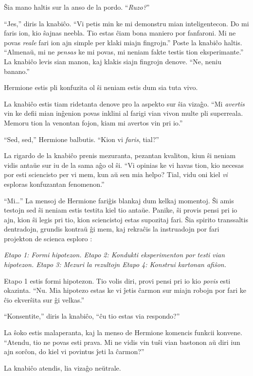 Ŝia mano haltis sur la anso de la pordo. ``\emph{Ruzo?}''

``Jes,'' diris la knabiĉo. ``Vi petis min ke mi demonstru mian
inteligentecon. Do mi faris ion, kio ŝajnas neebla. Tio estas ĉiam
bona maniero por fanfaroni. Mi ne povas \emph{reale} fari ion ajn
simple per klaki miajn fingrojn.'' Poste la knabiĉo haltis. ``Almenaŭ,
mi ne \emph{pensas} ke mi povas, mi neniam fakte testis tion
eksperimante.'' La knabiĉo levis sian manon, kaj klakis siajn fingrojn
denove. ``Ne, neniu banano.''

Hermione estis pli konfuzita ol ŝi neniam estis dum sia tuta vivo.

La knabiĉo estis tiam ridetanta denove pro la aspekto sur ŝia
vizaĝo. ``Mi \emph{avertis} vin ke defii mian inĝenion povas inklini
al farigi vian vivon multe pli superreala. Memoru tion la venontan
fojon, kiam mi avertos vin pri io.''

``Sed, sed,'' Hermione balbutis. ``Kion vi \emph{faris}, tial?''

La rigardo de la knabiĉo prenis mezuranta, pezantan kvaliton, kiun ŝi
neniam vidis antaŭe sur iu de la sama aĝo ol ŝi. ``Vi opinias ke vi
havas tion, kio necesas por esti sciencisto per vi mem, kun aŭ sen mia
helpo? Tial, vidu oni kiel \emph{vi} esploras konfuzantan fenomenon.''

``Mi\ldots'' La mensoj de Hermione fariĝis blankaj dum kelkaj
momentoj. Ŝi amis testojn sed ŝi neniam estis testita kiel tio antaŭe.
Panike, ŝi provis pensi pri io ajn, kion ŝi legis pri tio, kion
sciencistoj estas supozitaj fari. Ŝia spirito transsaltis dentradojn,
grundis kontraŭ ĝi mem, kaj rekraĉis la instruadojn por fari projekton
de scienca esploro :

\emph{Etapo 1: Formi hipotezon. Etapo 2: Kondukti eksperimenton por
testi vian hipotezon. Etapo 3: Mezuri la rezultojn Etapo 4: Konstrui
kartonan afiŝon.}


Etapo 1 estis formi hipotezon. Tio volis diri, provi pensi pri io kio
\emph{povis} esti okazinta. ``Nu. Mia hipotezo estas ke vi ĵetis
ĉarmon sur miajn robojn por fari ke ĉio ekverŝita sur ĝi velkas.''

``Konsentite,'' diris la knabiĉo, ``ĉu tio estas via respondo?''

La ŝoko estis malaperanta, kaj la menso de Hermione komencis funkcii
konvene. ``Atendu, tio ne povas esti prava. Mi ne vidis vin tuŝi vian
bastonon aŭ diri iun ajn sorĉon, do kiel vi povintus ĵeti la ĉarmon?''

La knabiĉo atendis, lia vizaĝo neŭtrale.

